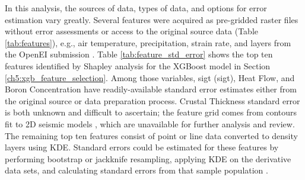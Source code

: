 In this analysis, the sources of data, types of data, and options for error estimation vary greatly. Several features were acquired as pre-gridded raster files without error assessments or access to the original source data (Table \ref{tab:features}), e.g., air temperature, precipitation, strain rate, and layers from the \citeauthor{bielicki_hydrogeolgic_2015} OpenEI submission \citep{kelley_geothermal_2015}. Table \ref{tab:feature_std_error} shows the top ten features identified by Shapley analysis for the XGBoost model in Section \ref{ch5:xgb_feature_selection}. Among those variables, \acrlong{sigt} (\acrshort{sigt}), Heat Flow, and Boron Concentration have readily-available standard error estimates either from the original source or data preparation process. Crustal Thickness standard error is both unknown and difficult to ascertain; the feature grid comes from contours fit to 2D seismic models \citep{keller_comparative_1991}, which are unavailable for further analysis and review. The remaining top ten features consist of point or line data converted to density layers using KDE. Standard errors could be estimated for these features by performing bootstrap or jackknife resampling, applying KDE on the derivative data sets, and calculating standard errors from that sample population .

